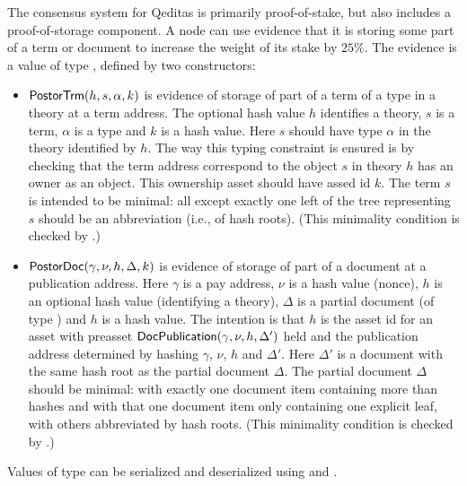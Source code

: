 The consensus system for Qeditas is primarily proof-of-stake,
but also includes a proof-of-storage component.
A node can use evidence that it is storing some
part of a term or document
to increase the weight of its stake by $25\%$.
The evidence is a value of type {}, defined by two constructors:
\begin{itemize}
\item ${\constr{PostorTrm}}(h,s,\alpha,k)$ is evidence of storage of part of a term of a type in a theory at a term address.
The optional hash value $h$ identifies a theory,
$s$ is a term, $\alpha$ is a type
and $k$ is a hash value.
Here $s$ should have type $\alpha$ in the theory identified by $h$.
The way this typing constraint is ensured is by checking that the term
address correspond to the object $s$ in theory $h$
has an owner as an object.
This ownership asset should have assed id $k$.
The term $s$ is intended to be minimal:
all except exactly one left of the tree representing $s$ should be 
an abbreviation (i.e., {} of hash roots).
(This minimality condition is checked by {}.)
\item ${\constr{PostorDoc}}(\gamma,\nu,h,\Delta,k)$ is evidence of storage of part of a document at a publication address.
Here $\gamma$ is a pay address, $\nu$ is a hash value (nonce), $h$ is an optional hash value (identifying a theory), $\Delta$ is a partial document (of type {})
and $h$ is a hash value.
The intention is that $h$ is the asset id for an asset with preasset ${\constr{DocPublication}}(\gamma,\nu,h,\Delta')$
held and the publication address determined by hashing $\gamma$, $\nu$, $h$ and $\Delta'$.
Here $\Delta'$ is a document with the same hash root as the partial document $\Delta$.
The partial document $\Delta$ should be minimal:
with exactly one document item containing more than hashes
and with that one document item only containing one explicit leaf,
with others abbreviated by hash roots.
(This minimality condition is checked by {}.)
\end{itemize}
Values of type {}
can be serialized and deserialized using
{} and
{}.

